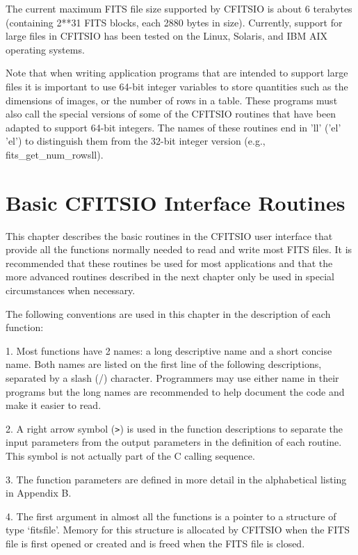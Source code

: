 \documentclass[11pt]{book}
\begin{document}
The current maximum FITS file size supported by  CFITSIO
is about 6 terabytes (containing
2**31 FITS blocks, each 2880 bytes in size). Currently, support for large
files in CFITSIO has been tested on the Linux, Solaris, and IBM AIX
operating systems.

Note that when writing application programs that are intended to support
large files it is important to use 64-bit integer variables
to store quantities such as the dimensions of images, or the number of
rows in a table.  These programs must also call the special versions
of some of the CFITSIO routines that have been adapted to
support 64-bit integers.  The names of these routines end in
'll' ('el' 'el') to distinguish them from the 32-bit integer
version (e.g.,  fits\_get\_num\_rowsll).


\chapter{Basic CFITSIO Interface Routines }

This chapter describes the basic routines in the CFITSIO user interface
that provide all the functions normally needed to read and write most
FITS files.  It is recommended that these routines be used for most
applications and that the more advanced routines described in the
next chapter only be used in special circumstances when necessary.

The following conventions are used in this chapter in the description
of each function:

1. Most functions have 2 names: a long descriptive name and a short
concise name.  Both names are listed on the first line of the following
descriptions, separated by a slash (/) character.  Programmers may use
either name in their programs but the long names are recommended to
help document the code and make it easier to read.

2. A right arrow symbol (\verb+>+) is used in the function descriptions to
separate the input parameters from the output parameters in the
definition of each routine.  This symbol is not actually part of the C
calling sequence.

3. The function parameters are defined in more detail in the
alphabetical listing in Appendix B.

4.  The first argument in almost all the functions is a pointer to a
structure of type `fitsfile'.  Memory for this structure is allocated
by CFITSIO when the FITS file is first opened or created and is freed
when the FITS file is closed.
\end{document}

